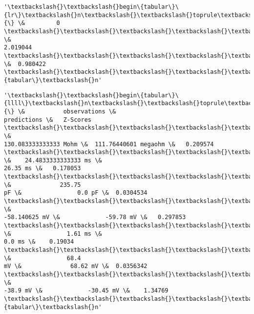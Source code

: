 \documentclass[11pt]{article}
\begin{document}
            \begin{tcolorbox}[breakable, size=fbox, boxrule=.5pt, pad at break*=1mm, opacityfill=0]
\begin{Verbatim}[commandchars=\\\{\}]
'\textbackslash{}\textbackslash{}begin\{tabular\}\{lr\}\textbackslash{}n\textbackslash{}\textbackslash{}toprule\textbackslash{}n\{\} \&         0 \textbackslash{}\textbackslash{}\textbackslash{}\textbackslash{}\textbackslash{}n\textbackslash{}\textbackslash{}midrule\textbackslash{}nchi\textbackslash{}\textbackslash{}\_square \&
2.019044 \textbackslash{}\textbackslash{}\textbackslash{}\textbackslash{}\textbackslash{}np\textbackslash{}\textbackslash{}\_value    \&  0.980422 \textbackslash{}\textbackslash{}\textbackslash{}\textbackslash{}\textbackslash{}n\textbackslash{}\textbackslash{}bottomrule\textbackslash{}n\textbackslash{}\textbackslash{}end\{tabular\}\textbackslash{}n'
\end{Verbatim}
\end{tcolorbox}
        
            \begin{tcolorbox}[breakable, size=fbox, boxrule=.5pt, pad at break*=1mm, opacityfill=0]
\begin{Verbatim}[commandchars=\\\{\}]
'\textbackslash{}\textbackslash{}begin\{tabular\}\{llll\}\textbackslash{}n\textbackslash{}\textbackslash{}toprule\textbackslash{}n\{\} \&           observations \&
predictions \&   Z-Scores \textbackslash{}\textbackslash{}\textbackslash{}\textbackslash{}\textbackslash{}n\textbackslash{}\textbackslash{}midrule\textbackslash{}nInputResistanceTest            \&
130.083333333333 Mohm \&  111.76440601 megaohm \&   0.209574
\textbackslash{}\textbackslash{}\textbackslash{}\textbackslash{}\textbackslash{}nTimeConstantTest               \&    24.4833333333333 ms \&
26.35 ms \&   0.178053 \textbackslash{}\textbackslash{}\textbackslash{}\textbackslash{}\textbackslash{}nCapacitanceTest                \&              235.75
pF \&                0.0 pF \&  0.0304534 \textbackslash{}\textbackslash{}\textbackslash{}\textbackslash{}\textbackslash{}nRestingPotentialTest           \&
-58.140625 mV \&             -59.78 mV \&   0.297853
\textbackslash{}\textbackslash{}\textbackslash{}\textbackslash{}\textbackslash{}nInjectedCurrentAPWidthTest     \&                1.61 ms \&
0.0 ms \&    0.19034 \textbackslash{}\textbackslash{}\textbackslash{}\textbackslash{}\textbackslash{}nInjectedCurrentAPAmplitudeTest \&                68.4
mV \&              68.62 mV \&  0.0356342 \textbackslash{}\textbackslash{}\textbackslash{}\textbackslash{}\textbackslash{}nInjectedCurrentAPThresholdTest \&
-38.9 mV \&             -30.45 mV \&    1.34769
\textbackslash{}\textbackslash{}\textbackslash{}\textbackslash{}\textbackslash{}n\textbackslash{}\textbackslash{}bottomrule\textbackslash{}n\textbackslash{}\textbackslash{}end\{tabular\}\textbackslash{}n'
\end{Verbatim}
\end{tcolorbox}
        
\end{document}
